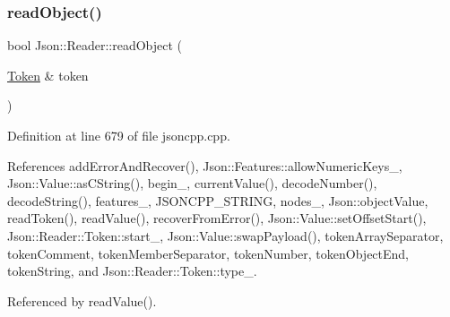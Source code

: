 \subsubsection{\texorpdfstring{read\+Object()}{readObject()}}
{\footnotesize\ttfamily bool Json\+::\+Reader\+::read\+Object (\begin{DoxyParamCaption}\item[{\hyperlink{class_json_1_1_reader_1_1_token}{Token} \&}]{token }\end{DoxyParamCaption})\hspace{0.3cm}{\ttfamily [private]}}



Definition at line 679 of file jsoncpp.\+cpp.



References add\+Error\+And\+Recover(), Json\+::\+Features\+::allow\+Numeric\+Keys\+\_\+, Json\+::\+Value\+::as\+C\+String(), begin\+\_\+, current\+Value(), decode\+Number(), decode\+String(), features\+\_\+, J\+S\+O\+N\+C\+P\+P\+\_\+\+S\+T\+R\+I\+NG, nodes\+\_\+, Json\+::object\+Value, read\+Token(), read\+Value(), recover\+From\+Error(), Json\+::\+Value\+::set\+Offset\+Start(), Json\+::\+Reader\+::\+Token\+::start\+\_\+, Json\+::\+Value\+::swap\+Payload(), token\+Array\+Separator, token\+Comment, token\+Member\+Separator, token\+Number, token\+Object\+End, token\+String, and Json\+::\+Reader\+::\+Token\+::type\+\_\+.



Referenced by read\+Value().



